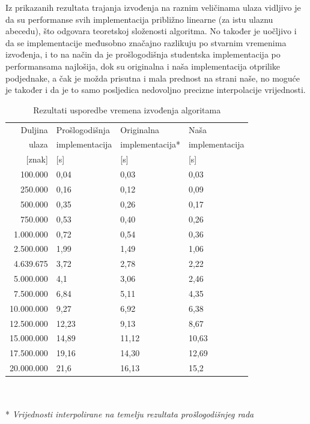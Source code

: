 \documentclass[a4paper,12pt]{article}
\begin{document}
Iz prikazanih rezultata trajanja izvođenja na raznim veličinama ulaza vidljivo je da su performanse svih implementacija približno linearne (za istu ulaznu abecedu), što odgovara teoretskoj složenosti algoritma. No također je uočljivo i da se implementacije međusobno značajno razlikuju po stvarnim vremenima izvođenja, i to na način da je prošlogodišnja studentska implementacija po performansama najlošija, dok su originalna i naša implementacija otprilike podjednake, a čak je možda prisutna i mala prednost na strani naše, no moguće je također i da je to samo posljedica nedovoljno precizne interpolacije vrijednosti.

\begin{table}[h!]
	\caption{Rezultati usporedbe vremena izvođenja algoritama}
	\label{tableTimeComp}
	\begin{center}
		\begin{tabular}{rlll}
			\toprule
			Duljina & Prošlogodišnja & Originalna & Naša \\
			ulaza & implementacija & implementacija* & implementacija \\
			{[znak]} & [s] & [s] & [s] \\
			\midrule
			100.000	   	& 	0,04 	&	0,03		&	0,03 \\
			250.000		& 	0,16	&	0,12		&	0,09 \\
			500.000		& 	0,35	&	0,26		&	0,17 \\
			750.000		& 	0,53	&	0,40		&	0,26 \\
			1.000.000	& 	0,72	&	0,54		&	0,36 \\
			2.500.000	& 	1,99	&	1,49		&	1,06 \\
			4.639.675	& 	3,72	&	2,78		&	2,22 \\
			5.000.000	& 	4,1		&	3,06		&	2,46 \\
			7.500.000	& 	6,84	&	5,11		&	4,35 \\
			10.000.000	& 	9,27	&	6,92		&	6,38 \\
			12.500.000	& 	12,23	&	9,13		&	8,67 \\
			15.000.000	& 	14,89	&	11,12		&	10,63 \\
			17.500.000	& 	19,16	&	14,30		&	12,69 \\
			20.000.000	& 	21,6	&	16,13		&	15,2 \\
			\bottomrule
		\end{tabular}\\ ~ \\
		* \textit{Vrijednosti interpolirane na temelju rezultata prošlogodišnjeg rada}
	\end{center}
\end{table}
\end{document}
